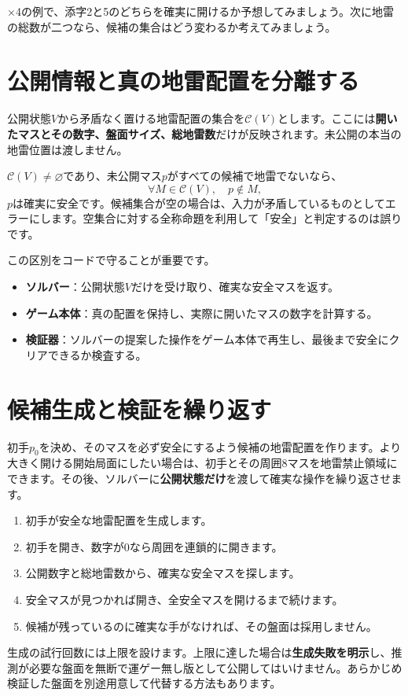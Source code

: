 \documentclass[11pt,a4paper,openany]{book}
\newcommand{\exercise}[1]{\begin{exercisebox}\RaggedRight #1\end{exercisebox}}
\begin{document}
\exercise{4×4の例で、添字2と5のどちらを確実に開けるか予想してみましょう。次に地雷の総数が二つなら、候補の集合はどう変わるか考えてみましょう。}

\section{公開情報と真の地雷配置を分離する}
公開状態\(V\)から矛盾なく置ける地雷配置の集合を\(\mathcal{C}(V)\)とします。ここには\textbf{開いたマスとその数字、盤面サイズ、総地雷数}だけが反映されます。未公開の本当の地雷位置は渡しません。

\(\mathcal{C}(V)\ne\varnothing\)であり、未公開マス\(p\)がすべての候補で地雷でないなら、
\[
\forall M\in\mathcal{C}(V),\quad p\notin M,
\]
\(p\)は確実に安全です。候補集合が空の場合は、入力が矛盾しているものとしてエラーにします。空集合に対する全称命題を利用して「安全」と判定するのは誤りです。

この区別をコードで守ることが重要です。
\begin{itemize}[leftmargin=*]
\item \textbf{ソルバー}：公開状態\(V\)だけを受け取り、確実な安全マスを返す。
\item \textbf{ゲーム本体}：真の配置を保持し、実際に開いたマスの数字を計算する。
\item \textbf{検証器}：ソルバーの提案した操作をゲーム本体で再生し、最後まで安全にクリアできるか検査する。
\end{itemize}

\section{候補生成と検証を繰り返す}
初手\(p_0\)を決め、そのマスを必ず安全にするよう候補の地雷配置を作ります。より大きく開ける開始局面にしたい場合は、初手とその周囲8マスを地雷禁止領域にできます。その後、ソルバーに\textbf{公開状態だけ}を渡して確実な操作を繰り返させます。
\begin{enumerate}[leftmargin=*]
\item 初手が安全な地雷配置を生成します。
\item 初手を開き、数字が0なら周囲を連鎖的に開きます。
\item 公開数字と総地雷数から、確実な安全マスを探します。
\item 安全マスが見つかれば開き、全安全マスを開けるまで続けます。
\item 候補が残っているのに確実な手がなければ、その盤面は採用しません。
\end{enumerate}
生成の試行回数には上限を設けます。上限に達した場合は\textbf{生成失敗を明示}し、推測が必要な盤面を無断で運ゲー無し版として公開してはいけません。あらかじめ検証した盤面を別途用意して代替する方法もあります。
\end{document}
